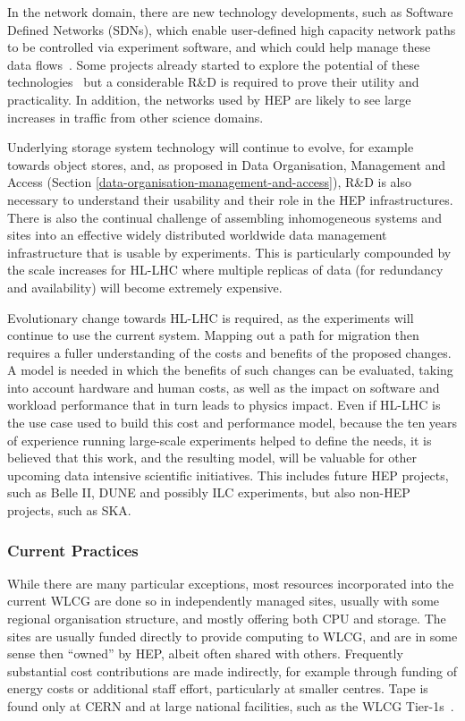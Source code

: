 In the network domain, there are new technology developments, such as
Software Defined Networks (SDNs), which enable user-defined high
capacity network paths to be controlled via experiment software, and
which could help manage these data flows~\cite{Blikra:2221659}.
Some projects already started
to explore the potential of these technologies~\cite{OSiRIS} but a
considerable R\&D is required to prove their utility and practicality.
In addition,
the networks used by HEP are likely to see large increases in traffic
from other science domains.

Underlying storage system technology will continue to evolve, for
example towards object stores, and, as proposed in  
Data Organisation, Management and Access  
(Section \ref{data-organisation-management-and-access}),
R\&D is also necessary to understand their usability and their role in
the HEP infrastructures. There is also the continual challenge of
assembling inhomogeneous systems and sites into an effective widely
distributed worldwide data management infrastructure that is usable by
experiments. This is particularly compounded by the scale increases for
HL-LHC where multiple replicas of data (for redundancy and availability)
will become extremely expensive.

Evolutionary change towards HL-LHC is required, as the experiments will
continue to use the current system. Mapping out a path for migration
then requires a fuller understanding of the costs and benefits of the
proposed changes. A model is needed in which the benefits of such
changes can be evaluated, taking into account hardware and human costs,
as well as the impact on software and workload performance that in turn
leads to physics impact. Even if HL-LHC is the use case used to build
this cost and performance model, because the ten years of experience
running large-scale experiments helped to define the needs, it is
believed that this work, and the resulting model, will be valuable for
other upcoming data intensive scientific initiatives. This includes
future HEP projects, such as Belle II, DUNE and possibly ILC
experiments, but also non-HEP projects, such as SKA.

\subsubsection*{Current Practices}

While there are many particular exceptions, most resources incorporated
into the current WLCG are done so in independently managed sites,
usually with some regional organisation structure, and mostly offering
both CPU and storage. The sites are usually funded directly to provide
computing to WLCG, and are in some sense then ``owned'' by HEP, albeit
often shared with others. Frequently substantial cost contributions are
made indirectly, for example through funding of energy costs or
additional staff effort, particularly at smaller centres. Tape is found
only at CERN and at large national facilities, such as the WLCG Tier-1s~\cite{Bird:1695401}.

